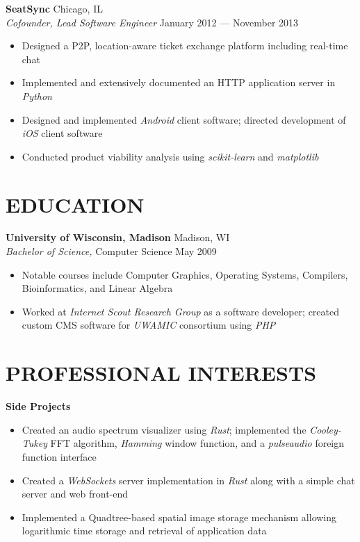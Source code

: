 \documentclass[line,margin]{res}
\begin{document}
\begin{resume}
    \textbf{SeatSync} \hfill Chicago, IL \\
    \textit{Cofounder, Lead Software Engineer}
        \hfill January 2012 --- November 2013
        \begin{itemize}  \itemsep -2pt
            \item Designed a P2P, location-aware ticket exchange platform
                including real-time chat
            \item Implemented and extensively documented an HTTP application
                server in \textit{Python}
            \item Designed and implemented \textit{Android} client software;
                directed development of \textit{iOS} client software
            \item Conducted product viability analysis using
                \textit{scikit-learn} and \textit{matplotlib}
        \end{itemize}


\section{EDUCATION}
    \textbf{University of Wisconsin, Madison}  \hfill Madison, WI \\
    \textit{Bachelor of Science,} Computer Science  \hfill May 2009
        \begin{itemize} \itemsep -2pt
            \item Notable courses include Computer Graphics, Operating Systems,
                Compilers, Bioinformatics, and Linear Algebra
            \item Worked at \textit{Internet Scout Research Group} as a
                software developer; created custom CMS software for
                \textit{UWAMIC} consortium using \textit{PHP}
        \end{itemize}


\section{PROFESSIONAL INTERESTS}
    \textbf{Side Projects}
    \begin{itemize} \itemsep -2pt
        \item Created an audio spectrum visualizer using \textit{Rust};
            implemented the \textit{Cooley-Tukey} FFT algorithm,
            \textit{Hamming} window function, and a \textit{pulseaudio} foreign
            function interface
        \item Created a \textit{WebSockets} server implementation in
            \textit{Rust} along with a simple chat server and web front-end
        \item Implemented a Quadtree-based spatial image storage mechanism
            allowing logarithmic time storage and retrieval of
            application data
    \end{itemize}


\end{resume}
\end{document}
